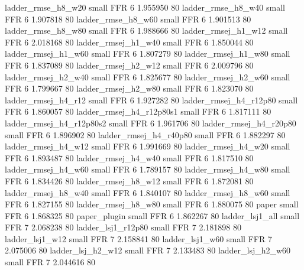       ladder_rmse_h8_w20      small      FFR                 6 1.955950 80
      ladder_rmse_h8_w40      small      FFR                 6 1.907818 80
      ladder_rmse_h8_w60      small      FFR                 6 1.901513 80
      ladder_rmse_h8_w80      small      FFR                 6 1.988666 80
     ladder_rmsej_h1_w12      small      FFR                 6 2.018168 80
     ladder_rmsej_h1_w40      small      FFR                 6 1.850044 80
     ladder_rmsej_h1_w60      small      FFR                 6 1.807279 80
     ladder_rmsej_h1_w80      small      FFR                 6 1.837089 80
     ladder_rmsej_h2_w12      small      FFR                 6 2.009796 80
     ladder_rmsej_h2_w40      small      FFR                 6 1.825677 80
     ladder_rmsej_h2_w60      small      FFR                 6 1.799667 80
     ladder_rmsej_h2_w80      small      FFR                 6 1.823070 80
     ladder_rmsej_h4_r12      small      FFR                 6 1.927282 80
  ladder_rmsej_h4_r12p80      small      FFR                 6 1.860057 80
ladder_rmsej_h4_r12p80s1      small      FFR                 6 1.817111 80
ladder_rmsej_h4_r12p80s2      small      FFR                 6 1.961706 80
  ladder_rmsej_h4_r20p80      small      FFR                 6 1.896902 80
  ladder_rmsej_h4_r40p80      small      FFR                 6 1.882297 80
     ladder_rmsej_h4_w12      small      FFR                 6 1.991669 80
     ladder_rmsej_h4_w20      small      FFR                 6 1.893487 80
     ladder_rmsej_h4_w40      small      FFR                 6 1.817510 80
     ladder_rmsej_h4_w60      small      FFR                 6 1.789157 80
     ladder_rmsej_h4_w80      small      FFR                 6 1.834426 80
     ladder_rmsej_h8_w12      small      FFR                 6 1.872081 80
     ladder_rmsej_h8_w40      small      FFR                 6 1.840107 80
     ladder_rmsej_h8_w60      small      FFR                 6 1.827155 80
     ladder_rmsej_h8_w80      small      FFR                 6 1.880075 80
                   paper      small      FFR                 6 1.868325 80
            paper_plugin      small      FFR                 6 1.862267 80
         ladder_lsj1_all      small      FFR                 7 2.068238 80
      ladder_lsj1_r12p80      small      FFR                 7 2.181898 80
         ladder_lsj1_w12      small      FFR                 7 2.158841 80
         ladder_lsj1_w60      small      FFR                 7 2.075006 80
       ladder_lsj_h2_w12      small      FFR                 7 2.133483 80
       ladder_lsj_h2_w60      small      FFR                 7 2.044616 80
